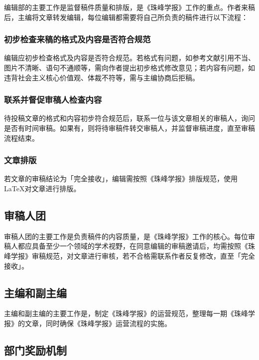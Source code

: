 \documentclass[
decoration,  %
]{qyxf-book}
\begin{document}
\begin{multicols}{2}
    编辑部的主要工作是监督稿件质量和排版，是《珠峰学报》工作的重点。作者来稿后，主编将文章转发编辑，每位编辑都需要将自己所负责的稿件进行以下流程：
    
    \subsubsection*{初步检查来稿的格式及内容是否符合规范}
    
    编辑应初步检查格式及内容是否符合规范。若格式有问题，如参考文献引用不当、图片不清晰、语句不通顺等，需向作者提出初步格式修改意见；若内容有问题，如违背社会主义核心价值观、体裁不符等，需与主编协商后拒稿。
    
    \subsubsection*{联系并督促审稿人检查内容}
    
    待投稿文章的格式和内容初步符合规范后，联系一位与该文章相关的审稿人，询问是否有时间审稿。如果有，则将待审稿件转交审稿人，并监督审稿进度，直至审稿流程结束。
    
    \subsubsection*{文章排版}
    
    若文章的审稿结论为「完全接收」，编辑需按照《珠峰学报》排版规范，使用 \LaTeX 对文章进行排版。
    
    \subsection*{审稿人团}
    
    审稿人团的主要工作是负责稿件的内容质量，是《珠峰学报》工作的核心。每位审稿人都应具备至少一个领域的学术视野，在同意编辑的审稿邀请后，均需按照《珠峰学报》审稿规范，对文章进行审核，若不合格需联系作者反复修改，直至「完全接收」。
    
    \subsection*{主编和副主编}
    
    主编和副主编的主要工作是，制定《珠峰学报》的运营规范，整理每一期《珠峰学报》的文章，同时确保《珠峰学报》运营流程的实施。
    
    \subsection*{部门奖励机制}
    

\end{multicols}
\end{document}

